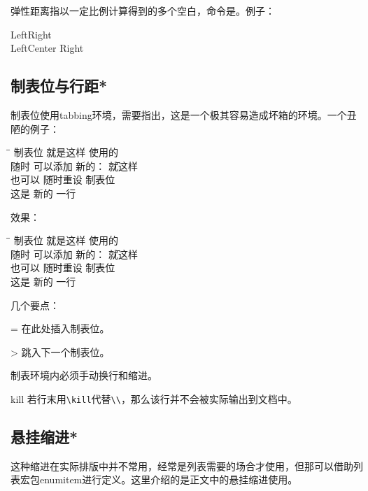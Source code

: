 弹性距离指以一定比例计算得到的多个空白，命令是\latexline{\\stretch}。例子：

\begin{codeshow}
Left\hspace{\fill}Right\\
LeftCenter
Right
\end{codeshow}

\subsection{制表位与行距*}
制表位使用tabbing环境，需要指出，这是一个极其容易造成坏箱的环境。一个丑陋的例子：
\begin{latex}{}
\begin{tabbing}
\hspace{4em}\=\hspace{8em}\=\kill
制表位 \> 就是这样 \> 使用的 \\
随时 \> 可以添加 \> 新的： \= 就这样 \\
也可以 \= 随时重设 \= 制表位 \\
这是 \> 新的 \> 一行
\end{tabbing}
\end{latex}

效果：
\begin{tabbing}
\hspace{4em}\=\hspace{8em}\=\kill
制表位 \> 就是这样 \> 使用的 \\
随时 \> 可以添加 \> 新的： \= 就这样 \\
也可以 \= 随时重设 \= 制表位 \\
这是 \> 新的 \> 一行
\end{tabbing}

几个要点：
\begin{para}
\item[\char92{}=] 在此处插入制表位。
\item[\char92{}>] 跳入下一个制表位。
\item[\char92{}\char92{}] 制表环境内必须手动换行和缩进。
\item[\char92{}kill] 若行末用\verb|\kill|代替\verb|\\|，那么该行并不会被实际输出到文档中。
\end{para}

\subsection{悬挂缩进*}
这种缩进在实际排版中并不常用，经常是列表需要的场合才使用，但那可以借助列表宏包enumitem进行定义。这里介绍的是正文中的悬挂缩进使用。


